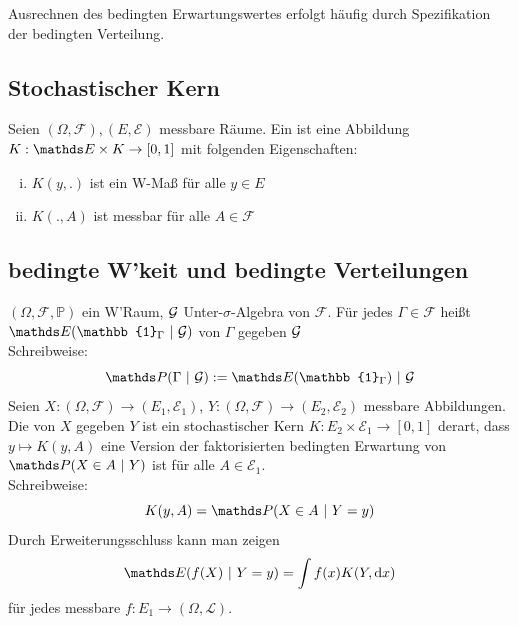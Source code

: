 Ausrechnen des bedingten Erwartungswertes erfolgt häufig durch Spezifikation der bedingten Verteilung.


\subsection{Stochastischer Kern}
\label{sub:stoch_kern}
Seien $(\Omega,\mathcal{F}),(E,\mathcal{E})$ messbare Räume. Ein  ist eine Abbildung $K:\E\times K \to [0,1]$ mit folgenden Eigenschaften:
\begin{enumerate}[(i)]
	\item $K(y,.)$ ist ein W-Maß für alle $y\in E$
	\item $K(.,A)$ ist messbar für alle $A\in \mathcal{F}$
\end{enumerate}


\subsection{bedingte W'keit und bedingte Verteilungen}
\label{sub:bed_wk_vert}
$(\Omega,\mathcal{F},\mathds{P})$ ein W'Raum, $\mathcal{G}$ Unter-$\sigma$-Algebra von $\mathcal{F}$. Für jedes $\Gamma\in \mathcal{F}$ heißt $\E(\mathbb{1}_\Gamma~|~\G)$  von $\Gamma$ gegeben $\mathcal{G}$\\
Schreibweise: \[\Pw(\Gamma~|~\G):=\E(\mathbb{1}_\Gamma)~|~\G \]
Seien $X:(\Omega,\mathcal{F})\to (E_1,\mathcal{E}_1)$, $Y:(\Omega,\mathcal{F})\to (E_2,\mathcal{E}_2)$ messbare Abbildungen.\\
Die  von $X$ gegeben $Y$ ist ein stochastischer Kern $K:E_2\times \mathcal{E}_1\to [0,1]$ derart, dass $y\mapsto K(y,A)$ eine Version der faktorisierten bedingten Erwartung von $\Pw(X\in A~|~Y)$ ist für alle $A\in\mathcal{E}_1$.\\
Schreibweise: \[K(y,A)=\Pw(X\in A~|~Y=y) \]
Durch Erweiterungsschluss kann man zeigen \[\E(f(X)~|~Y=y)= \int f(x) K(Y,\dint x) \]
für jedes messbare $f:E_1\to(\Omega,\mathcal{L})$.

